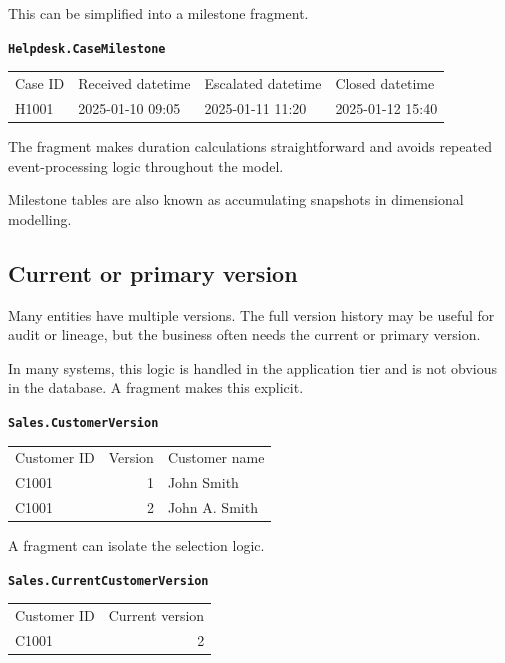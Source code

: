 \documentclass[10pt,openany,10pt]{book}
\newcounter{none}
\let\podeToprule\toprule
\let\podeMidrule\midrule
\let\podeBottomrule\bottomrule
\renewcommand{\toprule}{\arrayrulecolor{pbiGrid}\podeToprule}
\renewcommand{\midrule}{\arrayrulecolor{pbiGrid}\podeMidrule}
\renewcommand{\bottomrule}{\arrayrulecolor{pbiGrid}\podeBottomrule}
\begin{document}
This can be simplified into a milestone fragment.

\textbf{\texttt{Helpdesk.CaseMilestone}}

{\def\LTcaptype{none} %
\begin{longtable}[]{@{}llll@{}}
\toprule\noalign{}
Case ID & Received datetime & Escalated datetime & Closed datetime \\
\midrule\noalign{}
\endhead
\bottomrule\noalign{}
\endlastfoot
H1001 & 2025-01-10 09:05 & 2025-01-11 11:20 & 2025-01-12 15:40 \\
\end{longtable}
}

The fragment makes duration calculations straightforward and avoids
repeated event-processing logic throughout the model.

Milestone tables are also known as accumulating snapshots in dimensional
modelling.

\subsection{Current or primary
version}\label{current-or-primary-version}

Many entities have multiple versions. The full version history may be
useful for audit or lineage, but the business often needs the current or
primary version.

In many systems, this logic is handled in the application tier and is
not obvious in the database. A fragment makes this explicit.

\textbf{\texttt{Sales.CustomerVersion}}

{\def\LTcaptype{none} %
\begin{longtable}[]{@{}lrl@{}}
\toprule\noalign{}
Customer ID & Version & Customer name \\
\midrule\noalign{}
\endhead
\bottomrule\noalign{}
\endlastfoot
C1001 & 1 & John Smith \\
C1001 & 2 & John A. Smith \\
\end{longtable}
}

A fragment can isolate the selection logic.

\textbf{\texttt{Sales.CurrentCustomerVersion}}

{\def\LTcaptype{none} %
\begin{longtable}[]{@{}lr@{}}
\toprule\noalign{}
Customer ID & Current version \\
\midrule\noalign{}
\endhead
\bottomrule\noalign{}
\endlastfoot
C1001 & 2 \\
\end{longtable}
}
\end{document}
